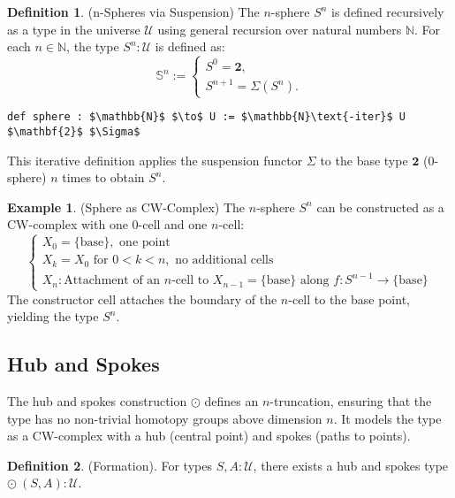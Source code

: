 \documentclass{article}
\theoremstyle{definition}
\newtheorem{definition}{Definition}
\newtheorem{example}{Example}
\begin{document}
\begin{definition} (n-Spheres via Suspension)
The \( n \)-sphere \( S^n \) is defined recursively as a type in
the universe \( \mathcal{U} \) using general recursion over natural
numbers \( \mathbb{N} \). For each \( n \in \mathbb{N} \),
the type \( S^n : \mathcal{U} \) is defined as:
\[
\mathbb{S}^n :=
\begin{cases}
S^0 = \mathbf{2}, \\
S^{n+1} = \Sigma(S^n).
\end{cases}
\]
\begin{lstlisting}[mathescape=true]
def sphere : $\mathbb{N}$ $\to$ U := $\mathbb{N}\text{-iter}$ U $\mathbf{2}$ $\Sigma$
\end{lstlisting}
This iterative definition applies the suspension functor \( \Sigma \)
to the base type \( \mathbf{2} \) (0-sphere) \( n \) times to obtain \( S^n \).
\end{definition}

\begin{example} (Sphere as CW-Complex)
The \( n \)-sphere \( S^n \) can be constructed as a CW-complex with
one 0-cell and one \( n \)-cell:
\[
\begin{cases}
X_0 = \{ \text{base} \}, \text{ one point} \\
X_k = X_0 \text{ for } 0 < k < n, \text{ no additional cells} \\
X_n: \text{Attachment of an } n\text{-cell to } X_{n-1} = \{ \text{base} \} \text{ along } f : S^{n-1} \to \{ \text{base} \}
\end{cases}
\]
The constructor \( \text{cell} \) attaches the boundary of the \( n \)-cell
to the base point, yielding the type \( S^n \).
\end{example}

\newpage
\subsection{Hub and Spokes}
The hub and spokes construction \( \odot \) defines an \( n \)-truncation,
ensuring that the type has no non-trivial homotopy groups above
dimension \( n \). It models the type as a CW-complex with
a hub (central point) and spokes (paths to points).

\begin{definition} (Formation).
For types \( S, A : \mathcal{U} \), there exists a hub and spokes type \( \odot\ (S,A) : \mathcal{U} \).
\end{definition}
\end{document}
